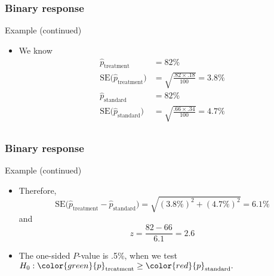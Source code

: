 \documentclass[handout]{beamer}
\begin{document}
   \begin{frame} \frametitle{Binary response}

   \begin{block}
   {Example (continued)}

   \begin{itemize}
   \item We know
     $$
     \begin{aligned}
     \widehat{p}_{\text{treatment}} &= 82 \% \\
     \text{SE($\widehat{p}_{\text{treatment}}$)} &= \sqrt{\frac{.82 \times .18}{100}} = 3.8\% \\
     \widehat{p}_{\text{standard}} &= 82 \% \\
     \text{SE($\widehat{p}_{\text{standard}}$)} &= \sqrt{\frac{.66 \times .34}{100}} = 4.7\% \\
     \end{aligned}
     $$
   \end{itemize}
   \end{block}
   \end{frame}


   \begin{frame} \frametitle{Binary response}

   \begin{block}
   {Example (continued)}

   \begin{itemize}

   \item Therefore,
     $$
     \text{SE($\widehat{p}_{\text{treatment}} - \widehat{p}_{\text{standard}}$)}
      = \sqrt{(3.8\%)^2+(4.7\%)^2} = 6.1\%
     $$
     and
     $$
     z = \frac{82-66}{6.1} = 2.6
     $$
     \item The one-sided $P$-value is .5\%, when we test
     $H_0: {\color{green} {p}_{\text{treatment}}} \geq {\color{red} {p}_{\text{standard}}}.$
   \end{itemize}
   \end{block}
   \end{frame}


   \begin{frame} 

   \end{frame}

   
\end{document}
